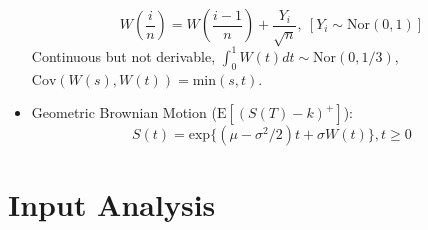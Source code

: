 \documentclass[10pt, twocolumn]{article}
\begin{document}
\begin{itemize}
\[ W(\frac{i}{n}) = W(\frac{i-1}{n}) + \frac{Y_i}{\sqrt{n}},\ [Y_i \sim \text{Nor}(0,1)] \]
Continuous but not derivable, $\int_0^1W(t)dt \sim \text{Nor}(0,1/3)$, $\text{Cov}(W(s),W(t)) = \text{min}(s,t)$. 
\item Geometric Brownian Motion ($\text{E}[(S(T)-k)^+]$): 
\[ S(t) = \text{exp}\{(\mu-\sigma^2/2)t + \sigma W(t)\}, t \geq 0 \]
\end{itemize}

\section*{Input Analysis}
\end{document}
